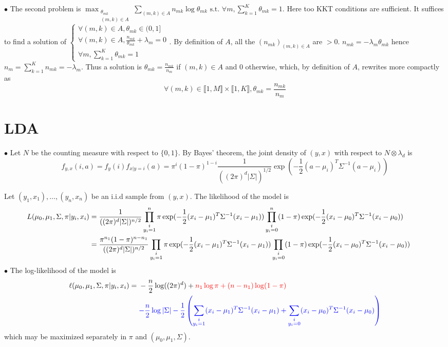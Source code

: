 \documentclass[a4paper,11pt]{article}
\begin{document}
\noindent $\bullet$ The second problem is $\displaystyle \max_{\substack{\theta_{mk}\\ (m,k)\in A}} \sum_{(m,k)\in A} n_{mk}\log \theta_{mk} \text{ s.t. } \forall m, \sum_{k=1}^K \theta_{mk} = 1$. Here too KKT conditions are sufficient. It suffices to find a solution of $\begin{cases}
  \forall (m,k)\in A, \theta_{mk}\in (0,1] \\
  \forall (m,k)\in A, \frac{n_{mk}}{\theta_{mk}} + \lambda_m = 0 \\
  \forall m, \sum_{k=1}^K \theta_{mk}= 1
\end{cases}$. \newline
By definition of $A$, all the $(n_{mk})_{(m,k)\in A}$ are $>0$. $n_{mk} = -\lambda_m \theta_{mk}$ hence $n_m = \sum_{k=1}^K n_{mk} = -\lambda_m$. Thus a solution is $\theta_{mk} = \frac{n_{mk}}{n_m}$ if $(m,k)\in A$ and $0$ otherwise, which, by definition of $A$, rewrites more compactly as $$\boxed{\forall (m,k)\in\llbracket1,M\rrbracket\times \llbracket1,K\rrbracket, \theta_{mk} = \frac{n_{mk}}{n_m}}$$

\section*{LDA}
$\bullet$ Let $N$ be the counting measure with respect to $\{0,1\}$. By Bayes' theorem, the joint density of $(y,x)$ with respect to $N\otimes \lambda_d$ is $$f_{y,x}(i,a) = f_{y}(i)f_{x|y=i}(a) = \pi^{i}{(1-\pi)}^{1-i}\frac{1}{((2\pi)^d|\Sigma|)^{1/2}} \exp(-\frac12 (a-\mu_i)^T\Sigma^{-1}(a-\mu_i))$$ 

\noindent Let $(y_1,x_1),\ldots,(y_n,x_n)$ be an i.i.d sample from $(y,x)$. The likelihood of the model is $$\hspace{-0.7cm}\begin{aligned}
  L(\mu_0,\mu_1,\Sigma,\pi|y_i,x_i) &= \frac{1}{((2\pi)^d|\Sigma|)^{n/2}}\prod_{\substack{i\\y_i=1}}^n \pi\exp(-\frac12 (x_i-\mu_1)^T\Sigma^{-1}(x_i-\mu_1))\prod_{\substack{i\\y_i=0}}^n (1-\pi)\exp(-\frac12 (x_i-\mu_0)^T\Sigma^{-1}(x_i-\mu_0))\\
  &= \frac{\pi^{n_1}(1-\pi)^{n-n_1}}{((2\pi)^d|\Sigma|)^{n/2}}\prod_{\substack{i\\y_i=1}} \pi\exp(-\frac12 (x_i-\mu_1)^T\Sigma^{-1}(x_i-\mu_1))\prod_{\substack{i\\y_i=0}}(1-\pi)\exp(-\frac12 (x_i-\mu_0)^T\Sigma^{-1}(x_i-\mu_0))
\end{aligned}$$
$\bullet$ The log-likelihood of the model is $$\ell(\mu_0,\mu_1,\Sigma,\pi|y_i,x_i) = \begin{aligned}[t]&-\frac n2 \log((2\pi)^d)+ \color{red}{n_1\log \pi +(n-n_1)\log(1-\pi)}\\ &\color{blue}{-\frac n2 \log |\Sigma| -\frac 12 \left( \sum_{\substack{i\\y_i=1}}(x_i-\mu_1)^T\Sigma^{-1}(x_i-\mu_1) + \sum_{\substack{i\\y_i=0}}(x_i-\mu_0)^T\Sigma^{-1}(x_i-\mu_0)\right)}\end{aligned}$$
which may be maximized separately in $\pi$ and $(\mu_0,\mu_1,\Sigma)$.\\
\end{document}
